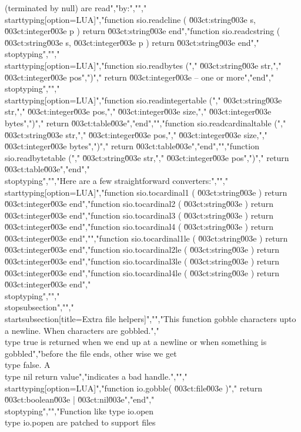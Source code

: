 (terminated by null) are read","by:","","\\starttyping[option=LUA]","function sio.readcline   ( \u003ct:string\u003e s, \u003ct:integer\u003e p ) return \u003ct:string\u003e end","function sio.readcstring ( \u003ct:string\u003e s, \u003ct:integer\u003e p ) return \u003ct:string\u003e end","\\stoptyping","","\\starttyping[option=LUA]","function sio.readbytes (","    \u003ct:string\u003e  str,","    \u003ct:integer\u003e pos",")","    return \u003ct:integer\u003e -- one or more","end","\\stoptyping","","\\starttyping[option=LUA]","function sio.readintegertable (","    \u003ct:string\u003e  str,","    \u003ct:integer\u003e pos,","    \u003ct:integer\u003e size,","    \u003ct:integer\u003e bytes",")","    return \u003ct:table\u003e","end","","function sio.readcardinaltable (","    \u003ct:string\u003e  str,","    \u003ct:integer\u003e pos,","    \u003ct:integer\u003e size,","    \u003ct:integer\u003e bytes",")","    return \u003ct:table\u003e","end","","function sio.readbytetable (","    \u003ct:string\u003e  str,","    \u003ct:integer\u003e pos",")","    return \u003ct:table\u003e","end","\\stoptyping","","Here are a few straightforward converters:","","\\starttyping[option=LUA]","function sio.tocardinal1 ( \u003ct:string\u003e ) return \u003ct:integer\u003e end","function sio.tocardinal2 ( \u003ct:string\u003e ) return \u003ct:integer\u003e end","function sio.tocardinal3 ( \u003ct:string\u003e ) return \u003ct:integer\u003e end","function sio.tocardinal4 ( \u003ct:string\u003e ) return \u003ct:integer\u003e end","","function sio.tocardinal1le ( \u003ct:string\u003e ) return \u003ct:integer\u003e end","function sio.tocardinal2le ( \u003ct:string\u003e ) return \u003ct:integer\u003e end","function sio.tocardinal3le ( \u003ct:string\u003e ) return \u003ct:integer\u003e end","function sio.tocardinal4le ( \u003ct:string\u003e ) return \u003ct:integer\u003e end","\\stoptyping","","\\stopsubsection","","\\startsubsection[title=Extra file helpers]","","This function gobble characters upto a newline. When characters are gobbled.","\\type {true} is returned when we end up at a newline or when something is gobbled","before the file ends, other wise we get \\type {false}. A \\type {nil} return value","indicates a bad handle.","","\\starttyping[option=LUA]","function io.gobble( \u003ct:file\u003e )","    return \u003ct:boolean\u003e | \u003ct:nil\u003e","end","\\stoptyping","","Function like type {io.open} \\type {io.popen} are patched to support files 